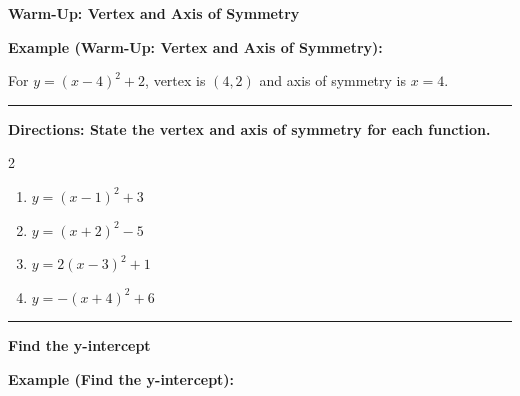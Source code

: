 \documentclass[12pt]{article}
\begin{document}
\vspace{0.35cm}

\begin{center}{\Large \textbf{Warm-Up: Vertex and Axis of Symmetry}}\end{center}\vspace{0.2cm}
\textbf{Example (Warm-Up: Vertex and Axis of Symmetry):}

For $y=(x-4)^2+2$, vertex is $(4,2)$ and axis of symmetry is $x=4$.

\vspace{0.2cm}\hrule\vspace{0.35cm}
\textbf{Directions: State the vertex and axis of symmetry for each function.}

\begin{multicols}{2}
\begin{enumerate}[label=\textbf{\arabic*.}, start=1, itemsep=1.3cm]
  \item $\displaystyle y=(x-1)^2+3$
  \item $\displaystyle y=(x+2)^2-5$
  \item $\displaystyle y=2(x-3)^2+1$
  \item $\displaystyle y=-(x+4)^2+6$
\end{enumerate}
\end{multicols}
\vspace{0.25cm}\hrule\vspace{0.35cm}

\begin{center}{\Large \textbf{Find the y-intercept}}\end{center}\vspace{0.2cm}
\textbf{Example (Find the y-intercept):}
\end{document}
